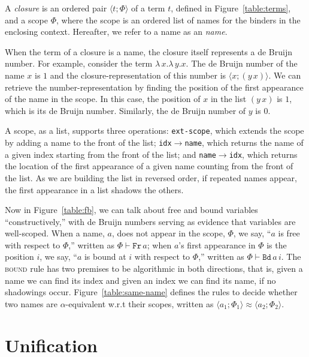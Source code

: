 \documentclass[a4paper,UKenglish]{lipics-v2016}
\newcommand{\clos}[2] {
  \langle #1; #2 \rangle
}
\newcommand{\aeq}[4] {
  \clos{#1}{#2} \approx \clos{#3}{#4}
}
\newcommand*{\transname}[1]{\textsc{#1}}
\begin{document}


\begin{definition}
  A \emph{closure} is an ordered pair $\clos{t}{\Phi}$ of a term $t$,
  defined in Figure~\ref{table:terms}, and a scope $\Phi$, where the
  scope is an ordered list of names for the binders in the enclosing
  context.  Hereafter, we refer to a name as an \emph{name}.
\end{definition}

When the term of a closure is a name, the closure itself represents a
de Bruijn number.  For example, consider the term
$\lambda\,x.\lambda\,y.x$. The de Bruijn number of the name $x$ is $1$
and the closure-representation of this number is $\clos{x}{(y\,x)}$.
We can retrieve the number-representation by finding the position of
the first appearance of the name in the scope. In this case, the
position of $x$ in the list $(y\,x)$ is $1$, which is its de Bruijn
number. Similarly, the de Bruijn number of $y$ is $0$.

A scope, as a list, supports three operations: \texttt{ext-scope},
which extends the scope by adding a name to the front of the list;
\texttt{idx$\rightarrow$name}, which returns the name of a given index
starting from the front of the list; and
\texttt{name$\rightarrow$idx}, which returns the location of the first
appearance of a given name counting from the front of the list.  As we
are building the list in reversed order, if repeated names appear, the
first appearance in a list shadows the others.

Now in Figure~\ref{table:fb}, we can talk about free and bound
variables ``constructively,'' with de Bruijn numbers serving as
evidence that variables are well-scoped.  When a name, $a$, does not
appear in the scope, $\Phi$, we say, ``$a$ is free with respect to
$\Phi$,'' written as $\Phi \vdash \texttt{Fr}\, a$; when $a$'s first
appearance in $\Phi$ is the position $i$, we say, ``$a$ is bound at
$i$ with respect to $\Phi$,'' written as $\Phi \vdash \texttt{Bd}\,
a\,i$.  The \transname{bound} rule has two premises to be algorithmic
in both directions, that is, given a name we can find its index and
given an index we can find its name, if no shadowings occur.
Figure~\ref{table:same-name} defines the rules to decide whether two
names are $\alpha$-equivalent w.r.t their scopes, written as
$\aeq{a_1}{\Phi_1}{a_2}{\Phi_2}$.

\pagebreak

\section{Unification}
\end{document}
